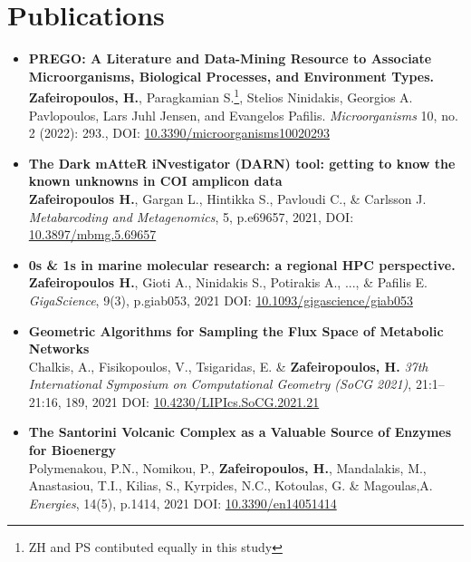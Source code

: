 \section*{Publications}

\begin{itemize}

   \item{
      \textbf{PREGO: A Literature and Data-Mining Resource to Associate Microorganisms, Biological Processes, and Environment Types.} \\ 
      \textbf{Zafeiropoulos, H.}, Paragkamian S.\footnote{ZH and PS contibuted equally in this study}, 
      Stelios Ninidakis, Georgios A. Pavlopoulos, Lars Juhl Jensen, and Evangelos Pafilis. \textit{Microorganisms} 10, no. 2 (2022): 293.,
      DOI: \href{https://doi.org/10.3390/microorganisms10020293}{10.3390/microorganisms10020293}
   }



   \item{
      \textbf{The Dark mAtteR iNvestigator (DARN) tool: getting to know the known unknowns in COI amplicon data} \\
      \textbf{Zafeiropoulos H.}, Gargan L., Hintikka S., Pavloudi C., \& Carlsson J. \textit{Metabarcoding and Metagenomics}, 5, p.e69657, 2021, 
      DOI: \href{https://doi.org/10.3897/mbmg.5.69657}{10.3897/mbmg.5.69657} 
   }

   \item{
      \textbf{0s \& 1s in marine molecular research: a regional HPC perspective.} \\
      \textbf{Zafeiropoulos H.}, Gioti A., Ninidakis S., Potirakis A., ..., \& Pafilis E. \textit{GigaScience},  9(3), p.giab053, 2021
      DOI: \href{https://doi.org/10.1093/gigascience/giab053}{10.1093/gigascience/giab053}
   }

   \item{
      \textbf{Geometric Algorithms for Sampling the Flux Space of Metabolic Networks} \\
      Chalkis, A., Fisikopoulos, V., Tsigaridas, E. \& \textbf{Zafeiropoulos, H.} \textit{37th International Symposium on Computational Geometry (SoCG 2021)}, 21:1--21:16, 189, 2021
      DOI: \href{https://drops.dagstuhl.de/opus/volltexte/2021/13820/}{10.4230/LIPIcs.SoCG.2021.21}
   }

   \item{
      \textbf{The Santorini Volcanic Complex as a Valuable Source of Enzymes for Bioenergy} \\ 
      Polymenakou, P.N., Nomikou, P., \textbf{Zafeiropoulos, H.}, Mandalakis, M., Anastasiou, T.I., Kilias, S., Kyrpides, N.C., Kotoulas, G. \& Magoulas,A. \textit{Energies}, 14(5), p.1414, 2021
      DOI: \href{https://doi.org/10.3390/en14051414}{10.3390/en14051414}
   }


\end{itemize}
